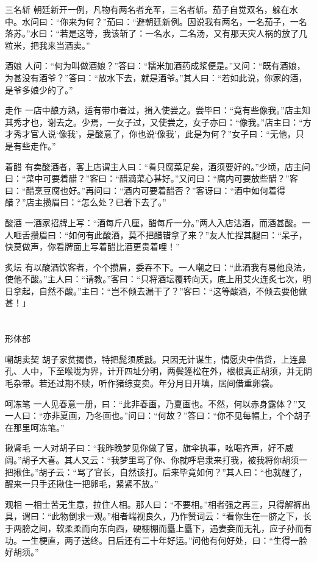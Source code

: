\documentclass[12pt,UTF8]{ctexbook}
\begin{document}
三名斩
朝廷新开一例，凡物有两名者充军，三名者斩。茄子自觉双名，躲在水中。水问曰：“你来为何？”茄曰：“避朝廷新例。因说我有两名，一名茄子，一名落苏。”水曰：“若是这等，我该斩了：一名水，二名汤，又有那天灾人祸的放了几粒米，把我来当酒卖。”

酒娘
人问：“何为叫做酒娘？”答曰：“糯米加酒药成浆便是。”又问：“既有酒娘，为甚没有酒爷？”答曰：“放水下去，就是酒爷。”其人曰：“若如此说，你家的酒，是爷多娘少的了。”

走作
一店中酿方熟，适有带巾者过，揖入使尝之。尝毕曰：“竟有些像我。”店主知其秀才也，谢去之。少焉，一女子过，又使尝之，女子亦曰：“像我。”店主曰：“方才秀才官人说‘像我’，是酸意了，你也说‘像我’，此是为何？”女子曰：“无他，只是有些走作。”

着醋
有卖酸酒者，客上店谓主人曰：“肴只腐菜足矣，酒须要好的。”少顷，店主问曰：“菜中可要着醋？”客曰：“醋滴菜心甚好。”又问曰：“腐内可要放些醋？”客曰：“醋烹豆腐也好。”再问曰：“酒内可要着醋否？”客讶曰：“酒中如何着得醋？”店主攒眉曰：“怎么处？已着下去了。”

酸酒
一酒家招牌上写：“酒每斤八厘，醋每斤一分。”两人入店沽酒，而酒甚酸。一人咂舌攒眉曰：“如何有此酸酒，莫不把醋错拿了来？”友人忙捏其腿曰：“呆子，快莫做声，你看牌面上写着醋比酒更贵着哩！”

炙坛
有以酸酒饮客者，个个攒眉，委吞不下。一人嘲之曰：“此酒我有易他良法，使他不酸。”主人曰：“请教。”客曰：“只将酒坛覆转向天，底上用艾火连炙七次，明日拿起，自然不酸。”主曰：“岂不倾去漏干了？”客曰：“这等酸酒，不倾去要他做甚！」

\part{}

形体部

嘲胡卖契
胡子家贫揭债，特把髭须质戤。只因无计谋生，情愿央中借贷，上连鼻孔、人中，下至喉咙为界，计开四址分明，两鬓篷松在外，根根真正胡须，并无阴毛杂带。若还过期不赎，听作猪综变卖。年分月日开填，居间借重卵袋。

呵冻笔
一人见春意一册，曰：“此非春画，乃夏画也。不然，何以赤身露体？”又一人曰：“亦非夏画，乃冬画也。”问曰：“何故？”答曰：“你不见每幅上，个个胡子在那里呵冻笔。”

揪肾毛
一人对胡子曰：“我昨晚梦见你做了官，旗伞执事，吆喝齐声，好不威阔。”胡子大喜。其人又云：“我梦里骂了你、你就呼皂隶来打我，被我将你胡须一把揪住。”胡子云：“骂了官长，自然该打。后来毕竟如何？”其人曰：“也就醒了，醒来一只手还揪住一把卵毛，紧紧不放。”

观相
一相士苦无生意，拉住人相。那人曰：“不要相。”相者强之再三，只得解裤出具，谓曰：“此物倒求一观。”相者端视良久，乃作赞词云：“看你生在一脐之下，长于两膀之间，软柔柔而向东向西，硬棚棚而矗上矗下，遇妻妾而无礼，应子孙而有功。一生梗直，两子送终。日后还有二十年好运。”问他有何好处，曰：“生得一脸好胡须。”
\end{document}

